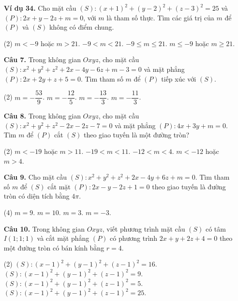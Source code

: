 \documentclass[12pt, a4paper]{article}
\begin{document}
\begin{enumerate}[label=\textbf{\arabic*.}, wide=0pt, leftmargin=*]
    \item[\textbf{Ví dụ 34.}] Cho mặt cầu \((S): (x+1)^2+(y-2)^2+(z-3)^2=25\) và \((P): 2x+y-2z+m=0\), với \(m\) là tham số thực. Tìm các giá trị của \(m\) để \((P)\) và \((S)\) không có điểm chung.
    \begin{tasks}(2)
        \task \(m < -9\) hoặc \(m > 21\).
        \task \(-9 < m < 21\).
        \task \(-9 \le m \le 21\).
        \task \(m \le -9\) hoặc \(m \ge 21\).
    \end{tasks}
    
    
    \item[\textbf{Câu 7.}] Trong không gian \(Oxyz\), cho mặt cầu \((S): x^2+y^2+z^2+2x-4y-6z+m-3=0\) và mặt phẳng \((P): 2x+2y+z+5=0\). Tìm tham số \(m\) để \((P)\) tiếp xúc với \((S)\).
    \begin{tasks}(2)
        \task \(m = -\dfrac{53}{9}\).
        \task \(m = -\dfrac{12}{5}\).
        \task \(m = -\dfrac{13}{3}\).
        \task \(m = -\dfrac{11}{3}\).
    \end{tasks}

    \item[\textbf{Câu 8.}] Trong không gian \(Oxyz\), cho mặt cầu \((S): x^2+y^2+z^2-2x-2z-7=0\) và mặt phẳng \((P): 4x+3y+m=0\). Tìm \(m\) để \((P)\) cắt \((S)\) theo giao tuyến là một đường tròn?
    \begin{tasks}(2)
        \task \(m<-19\) hoặc \(m>11\).
        \task \(-19<m<11\).
        \task \(-12<m<4\).
        \task \(m<-12\) hoặc \(m>4\).
    \end{tasks}
    
    \item[\textbf{Câu 9.}] Cho mặt cầu \((S): x^2+y^2+z^2+2x-4y+6z+m=0\). Tìm tham số \(m\) để \((S)\) cắt mặt \((P): 2x-y-2z+1=0\) theo giao tuyến là đường tròn có diện tích bằng \(4\pi\).
    \begin{tasks}(4)
        \task \(m=9\).
        \task \(m=10\).
        \task \(m=3\).
        \task \(m=-3\).
    \end{tasks}
    
    \item[\textbf{Câu 10.}] Trong không gian \(Oxyz\), viết phương trình mặt cầu \((S)\) có tâm \(I(1;1;1)\) và cắt mặt phẳng \((P)\) có phương trình \(2x+y+2z+4=0\) theo một đường tròn có bán kính bằng \(r=4\).
    \begin{tasks}(2)
        \task \((S): (x-1)^2+(y-1)^2+(z-1)^2 = 16\).
        \task \((S): (x-1)^2+(y-1)^2+(z-1)^2 = 9\).
        \task \((S): (x-1)^2+(y-1)^2+(z-1)^2 = 5\).
        \task \((S): (x-1)^2+(y-1)^2+(z-1)^2 = 25\).
    \end{tasks}
    
\end{enumerate}
\end{document}
